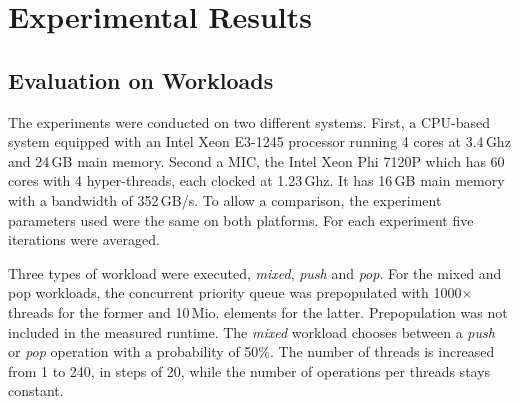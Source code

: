 \section{Experimental Results}
\label{sec:exp}
\subsection{Evaluation on Workloads}
The experiments were conducted on two different systems. First, a CPU-based system equipped with an Intel Xeon E3-1245 processor running 4 cores at 3.4\,Ghz and 24\,GB main memory. Second a MIC, the Intel Xeon Phi 7120P which has 60 cores with 4 hyper-threads, each clocked at 1.23\,Ghz. It has 16\,GB main memory with a bandwidth of 352\,GB/s. To allow a comparison, the experiment parameters used were the same on both platforms. For each experiment five iterations were averaged. %

Three types of workload were executed, \textit{mixed}, \textit{push} and \textit{pop}. For the mixed and pop workloads, the concurrent priority queue was prepopulated with 1000$\times$threads for the former and 10\,Mio. elements for the latter. Prepopulation was not included in the measured runtime. The \textit{mixed} workload chooses between a \textit{push} or \textit{pop} operation with a probability of 50\%. The number of threads is increased from 1 to 240, in steps of 20, while the number of operations per threads stays constant.

